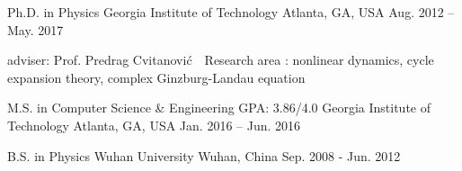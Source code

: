 


\begin{cventries}

\cveducation
{Ph.D. in Physics}
{Georgia Institute of Technology}
{Atlanta, GA, USA}
{Aug. 2012 -- May. 2017}
{
  \begin{cvitems}
    \item adviser: Prof. Predrag Cvitanovi\'c \quad \quad 
    \bullet \,\, Research area : nonlinear dynamics, cycle expansion theory,
      complex Ginzburg-Landau equation
  \end{cvitems}
}


\cvmaster
{M.S. in Computer Science \& Engineering }
{GPA: 3.86/4.0}
{Georgia Institute of Technology}
{Atlanta, GA, USA}
{Jan. 2016 -- Jun. 2016}

\cveducation
{B.S. in Physics} %
{Wuhan University} %
{Wuhan, China} %
{Sep. 2008 - Jun. 2012} %
{    
}
\vspace{-1em}



\end{cventries}

